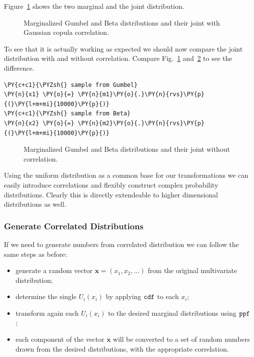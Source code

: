 Figure~\ref{fig:gumbel_beta_with_corr} shows the two marginal and the joint distribution.

\begin{figure}[htb]
  \centering
  \caption{Marginalized Gumbel and Beta distributions and their joint with Gaussian copula correlation.}
  \label{fig:gumbel_beta_with_corr}
\end{figure}
    
    To see that it is actually working as expected we should now compare the joint
    distribution with and without correlation. Compare Fig.~\ref{fig:gumbel_beta_with_corr} and~\ref{fig:gumbel_beta_without_corr} to see the
    difference.

\begin{tcolorbox}[breakable, size=fbox, boxrule=1pt, pad at break*=1mm,colback=cellbackground, colframe=cellborder]
\begin{Verbatim}[commandchars=\\\{\}]
\PY{c+c1}{\PYZsh{} sample from Gumbel}
\PY{n}{x1} \PY{o}{=} \PY{n}{m1}\PY{o}{.}\PY{n}{rvs}\PY{p}{(}\PY{l+m+mi}{10000}\PY{p}{)}
\PY{c+c1}{\PYZsh{} sample from Beta}
\PY{n}{x2} \PY{o}{=} \PY{n}{m2}\PY{o}{.}\PY{n}{rvs}\PY{p}{(}\PY{l+m+mi}{10000}\PY{p}{)}
\end{Verbatim}
\end{tcolorbox}

\begin{figure}[htb]
  \centering
  \caption{Marginalized Gumbel and Beta distributions and their joint without correlation.}
  \label{fig:gumbel_beta_without_corr}
\end{figure}
    
    Using the uniform distribution as a common base for our transformations
we can easily introduce correlations and flexibly construct complex
probability distributions. Clearly this is directly extendeable to
higher dimensional distributions as well.

\subsubsection{Generate Correlated Distributions}\label{generate-correlated-distributions}

If we need to generate numbers from correlated distribution we can
follow the same steps as before:

\begin{itemize}
\tightlist
\item
  generate a random vector \(\mathbf{x}=(x_1, x_2,\ldots)\) from the
  original multivariate distribution;
\item
  determine the single \(U_i(x_i)\) by applying \(\tt{cdf}\) to each
  \(x_i\);
\item
  transform again each \(U_i(x_i)\) to the desired marginal
  distributions using \(\tt{ppf}\);
\item
  each component of the vector \(\mathbf{x}\) will be converted to a set
  of random numbers drawn from the desired distributions, with the
  appropriate correlation.
\end{itemize}

